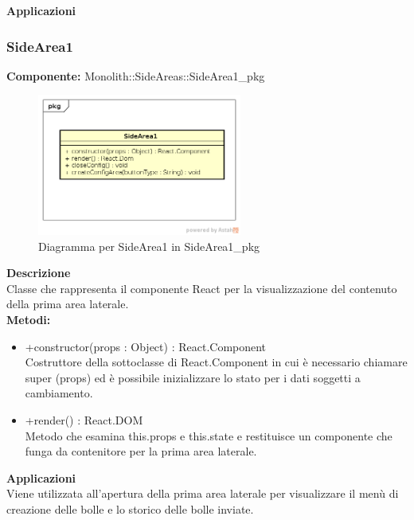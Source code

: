 \textbf{Applicazioni}\\
 


\clearpage

\subsubsection{SideArea1}
\textbf{Componente:}  Monolith::SideAreas::SideArea1\_pkg\\
   \FloatBarrier
   \begin{figure}[ht]
   \centering
   \includegraphics[width=0.6\textwidth]{img/single-SideArea1.png}
   \caption{{Diagramma per SideArea1 in SideArea1\_pkg}}
\end{figure}
\FloatBarrier
\textbf{Descrizione}\\
Classe che rappresenta il componente React per la visualizzazione del contenuto della prima area laterale. \\ 
\textbf{Metodi:}
\begin{itemize}

\item +constructor(props : Object) : React.Component 
\\
Costruttore della sottoclasse di React.Component in cui è necessario chiamare super (props) ed è possibile inizializzare lo stato per i dati soggetti a cambiamento.

\item +render() : React.DOM 
\\
Metodo che esamina this.props e this.state e restituisce un componente che funga da contenitore per la prima area laterale.

\end{itemize} 


\textbf{Applicazioni}\\
Viene utilizzata all'apertura della prima area laterale per visualizzare il menù di creazione delle bolle e lo storico delle bolle inviate. 


